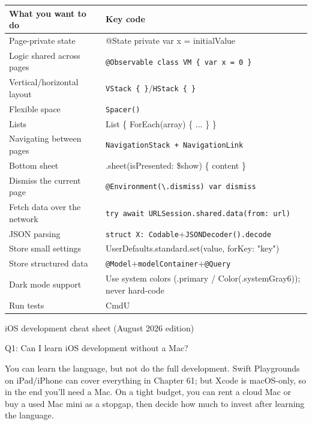 


\begin{center}
\begin{tabularx}{\linewidth}{|X|X|}
\hline
\textbf{What you want to do} & \textbf{Key code} \tabularnewline
\hline
Page-private state & @State private var x = initialValue \tabularnewline
Logic shared across pages & \texttt{@Observable class VM \{ var x = 0 \}} \tabularnewline
Vertical/horizontal layout & \texttt{VStack \{ \}}/\texttt{HStack \{ \}} \tabularnewline
Flexible space & \texttt{Spacer()} \tabularnewline
Lists & List \{ ForEach(array) \{ ... \} \} \tabularnewline
Navigating between pages & \texttt{NavigationStack + NavigationLink} \tabularnewline
Bottom sheet & .sheet(isPresented: \$show) \{ content \} \tabularnewline
Dismiss the current page & \texttt{@Environment(\textbackslash{}.\allowbreak dismiss) var dismiss} \tabularnewline
Fetch data over the network & \texttt{try await URLSession.\allowbreak shared.\allowbreak data(from: url)} \tabularnewline
JSON parsing & \texttt{struct X: Codable}+\texttt{JSONDecoder().\allowbreak decode} \tabularnewline
Store small settings & UserDefaults.standard.set(value, forKey: "key") \tabularnewline
Store structured data & \texttt{@Model}+\texttt{modelContainer}+\texttt{@Query} \tabularnewline
Dark mode support & Use system colors (.primary / Color(.systemGray6)); never hard-code \tabularnewline
Run tests & CmdU \tabularnewline
\hline
\end{tabularx}
\end{center}

\begin{center}\small\color{gray}iOS development cheat sheet (August 2026 edition)\end{center}


Q1: Can I learn iOS development without a Mac?

You can learn the language, but not do the full development. Swift Playgrounds on iPad/iPhone can cover everything in Chapter 61; but Xcode is macOS-only, so in the end you'll need a Mac. On a tight budget, you can rent a cloud Mac or buy a used Mac mini as a stopgap, then decide how much to invest after learning the language.

